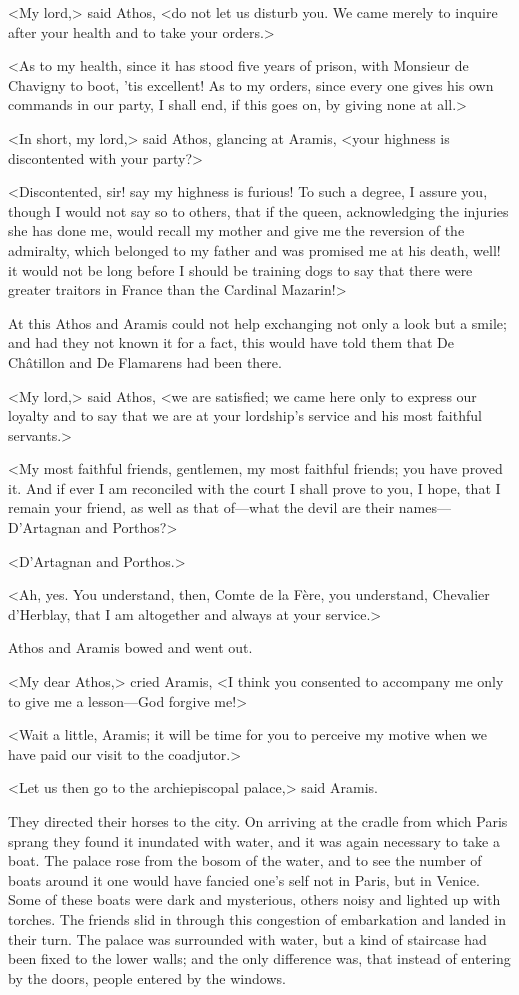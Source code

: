 <My lord,> said Athos, <do not let us disturb you. We came merely to inquire after your health and to take your orders.>

<As to my health, since it has stood five years of prison, with Monsieur de Chavigny to boot, 'tis excellent! As to my orders, since every one gives his own commands in our party, I shall end, if this goes on, by giving none at all.>

<In short, my lord,> said Athos, glancing at Aramis, <your highness is discontented with your party?>

<Discontented, sir! say my highness is furious! To such a degree, I assure you, though I would not say so to others, that if the queen, acknowledging the injuries she has done me, would recall my mother and give me the reversion of the admiralty, which belonged to my father and was promised me at his death, well! it would not be long before I should be training dogs to say that there were greater traitors in France than the Cardinal Mazarin!>

At this Athos and Aramis could not help exchanging not only a look but a smile; and had they not known it for a fact, this would have told them that De Châtillon and De Flamarens had been there.

<My lord,> said Athos, <we are satisfied; we came here only to express our loyalty and to say that we are at your lordship's service and his most faithful servants.>

<My most faithful friends, gentlemen, my most faithful friends; you have proved it. And if ever I am reconciled with the court I shall prove to you, I hope, that I remain your friend, as well as that of—what the devil are their names—D'Artagnan and Porthos?>

<D'Artagnan and Porthos.>

<Ah, yes. You understand, then, Comte de la Fère, you understand, Chevalier d'Herblay, that I am altogether and always at your service.>

Athos and Aramis bowed and went out.

<My dear Athos,> cried Aramis, <I think you consented to accompany me only to give me a lesson—God forgive me!>

<Wait a little, Aramis; it will be time for you to perceive my motive when we have paid our visit to the coadjutor.>

<Let us then go to the archiepiscopal palace,> said Aramis.

They directed their horses to the city. On arriving at the cradle from which Paris sprang they found it inundated with water, and it was again necessary to take a boat. The palace rose from the bosom of the water, and to see the number of boats around it one would have fancied one's self not in Paris, but in Venice. Some of these boats were dark and mysterious, others noisy and lighted up with torches. The friends slid in through this congestion of embarkation and landed in their turn. The palace was surrounded with water, but a kind of staircase had been fixed to the lower walls; and the only difference was, that instead of entering by the doors, people entered by the windows.

